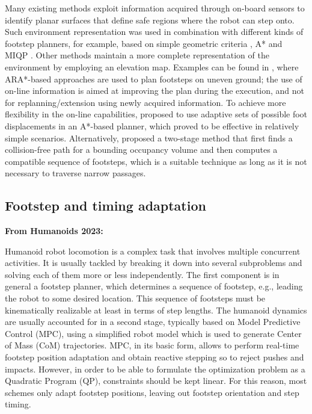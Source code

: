 Many existing methods exploit information acquired through on-board sensors to identify planar surfaces that define safe regions where the robot can step onto.
Such environment representation was used in combination with different kinds of footstep planners, for example, based on simple geometric criteria \cite{Okada2005ICRA}, A* \cite{Chestnutt2009IROS} and MIQP \cite{Fallon2015Humanoids}.   
Other methods maintain a more complete representation of the environment by employing an elevation map.
Examples can be found in \cite{Maier2013IROS, Stumpf2014Humanoids}, where ARA*-based approaches are used to plan footsteps on uneven ground; the use of on-line information is aimed at improving the plan during the execution, and not for replanning/extension using newly acquired information.
To achieve more flexibility in the on-line capabilities, \cite{Karkowski2016Humanoids} proposed to use adaptive sets of possible foot displacements in an A*-based planner, which proved to be effective in relatively simple scenarios. Alternatively, \cite{Yamamoto2021AdvancedRobotics} proposed a two-stage method that first finds a collision-free path for a bounding occupancy volume and then computes a compatible sequence of footsteps, which is a suitable technique as long as it is not necessary to traverse narrow passages.

\subsection{Footstep and timing adaptation}
\textbf{From Humanoids 2023:}

Humanoid robot locomotion is a complex task that involves multiple concurrent activities. It is usually tackled by breaking it down into several subproblems and solving each of them more or less independently. The first component is in general a footstep planner, which determines a sequence of footstep, e.g., leading the robot to some desired location. This sequence of footsteps must be kinematically realizable at least in terms of step lengths. The humanoid dynamics are usually accounted for in a second stage, typically based on Model Predictive Control (MPC), using a simplified robot model which is used to generate Center of Mass (CoM) trajectories. MPC, in its basic form, allows to perform real-time footstep position adaptation \cite{Herdt2010IROS} and obtain reactive stepping so to  reject pushes and impacts. However, in order to be able to formulate the optimization problem as a Quadratic Program (QP), constraints should be kept linear. For this reason, most schemes only adapt footstep positions, leaving out footstep orientation and step timing.

